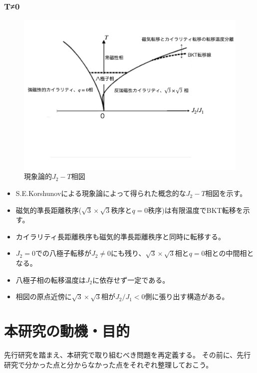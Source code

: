 \documentclass[12pt,titlepage,dvipdfmx]{jarticle}
\begin{document}
\subsubsection{T≠0}
\begin{figure}[tbh]
   \centering
   \includegraphics[width=15cm]{figure/schematic_phase_diagram.pdf}
   \caption{現象論的$J_2-T$相図}
\end{figure}

\begin{itemize}
   \item S.E.Korshunovによる現象論によって得られた概念的な$J_2-T$相図を示す。
   \item 磁気的準長距離秩序($\sqrt{3}\times\sqrt{3}$秩序と$q=0$秩序)は有限温度でBKT転移を示す。
   \item カイラリティ長距離秩序も磁気的準長距離秩序と同時に転移する。
   \item $J_2=0$での八極子転移が$J_2\neq0$にも残り、$\sqrt{3}\times\sqrt{3}$相と$q=0$相との中間相となる。
   \item 八極子相の転移温度は$J_2$に依存せず一定である。
   \item 相図の原点近傍に$\sqrt{3}\times\sqrt{3}$相が$J_2/J_1<0$側に張り出す構造がある。
\end{itemize}
\newpage

\section{本研究の動機・目的}
先行研究を踏まえ、本研究で取り組むべき問題を再定義する。
その前に、先行研究で分かった点と分からなかった点をそれぞれ整理しておこう。
\end{document}
